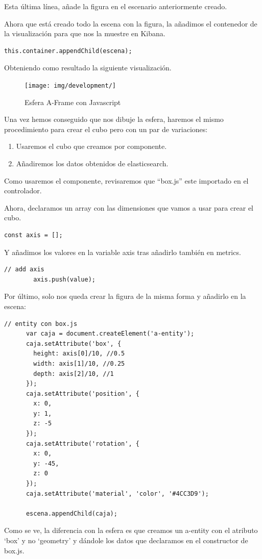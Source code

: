 \documentclass[a4paper, 12pt]{book}
\begin{document}
Esta última línea, añade la figura en el escenario anteriormente creado.

Ahora que está creado todo la escena con la figura, la añadimos el contenedor de la visualización para que nos la muestre en Kibana.

\begin{lstlisting}[frame=single]
     this.container.appendChild(escena);
\end{lstlisting}

Obteniendo como resultado la siguiente visualización.

\begin{figure}[H]
  \centering
  \texttt{[image: img/development/]}
  \caption{Esfera A-Frame con Javascript}
  \label{fig:onlysphere}
\end{figure}

Una vez hemos conseguido que nos dibuje la esfera, haremos el mismo procedimiento para crear el cubo pero con un par de variaciones:

\begin{enumerate}
    \item Usaremos el cubo que creamos por componente.
    \item Añadiremos los datos obtenidos de elasticsearch.
\end{enumerate}

Como usaremos el componente, revisaremos que “box.js” este importado en el controlador.

Ahora, declaramos un array con las dimensiones que vamos a usar para crear el cubo. 

\begin{lstlisting}[frame=single]
     const axis = [];
\end{lstlisting}
Y añadimos los valores en la variable axis tras añadirlo también en metrics.
\begin{lstlisting}[frame=single]
       // add axis
        axis.push(value);
\end{lstlisting}
Por último, solo nos queda crear la figura de la misma forma y añadirlo en la escena:
\begin{lstlisting}[frame=single]
     // entity con box.js
      var caja = document.createElement('a-entity');
      caja.setAttribute('box', {
        height: axis[0]/10, //0.5
        width: axis[1]/10, //0.25
        depth: axis[2]/10, //1
      });
      caja.setAttribute('position', {
        x: 0,
        y: 1,
        z: -5
      });
      caja.setAttribute('rotation', {
        x: 0,
        y: -45,
        z: 0
      });
      caja.setAttribute('material', 'color', '#4CC3D9');

      escena.appendChild(caja);
\end{lstlisting}
Como se ve, la diferencia con la esfera es que creamos un a-entity con el atributo ‘box’ y no ‘geometry’ y dándole los datos que declaramos en el constructor de box.js.
\end{document}
